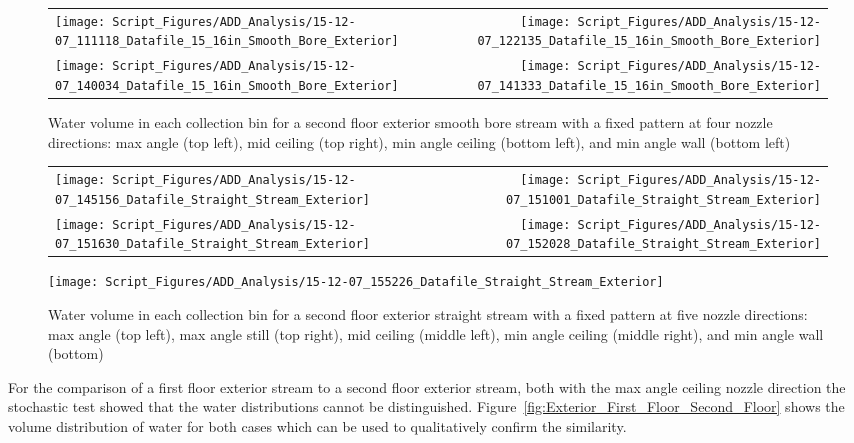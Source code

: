 \documentclass{article}
\begin{document}
\begin{figure}[ht]
\begin{tabular*}{\textwidth}{lr}
\texttt{[image: Script\_Figures/ADD\_Analysis/15-12-07\_111118\_Datafile\_15\_16in\_Smooth\_Bore\_Exterior]} &
\texttt{[image: Script\_Figures/ADD\_Analysis/15-12-07\_122135\_Datafile\_15\_16in\_Smooth\_Bore\_Exterior]} \\
\texttt{[image: Script\_Figures/ADD\_Analysis/15-12-07\_140034\_Datafile\_15\_16in\_Smooth\_Bore\_Exterior]} &
\texttt{[image: Script\_Figures/ADD\_Analysis/15-12-07\_141333\_Datafile\_15\_16in\_Smooth\_Bore\_Exterior]} \\
\end{tabular*}
\caption{Water volume in each collection bin for a second floor exterior smooth bore stream with a fixed pattern at four nozzle directions: max angle (top left), mid ceiling (top right), min angle ceiling (bottom left), and min angle wall (bottom left)}
\label{fig:Exterior_Second_Floor_Varying_Nozzle_Directions_SB_Fixed_Pattern}
\end{figure}

\begin{figure}[ht]
\begin{tabular*}{\textwidth}{lr}
\texttt{[image: Script\_Figures/ADD\_Analysis/15-12-07\_145156\_Datafile\_Straight\_Stream\_Exterior]} &
\texttt{[image: Script\_Figures/ADD\_Analysis/15-12-07\_151001\_Datafile\_Straight\_Stream\_Exterior]} \\
\texttt{[image: Script\_Figures/ADD\_Analysis/15-12-07\_151630\_Datafile\_Straight\_Stream\_Exterior]} &
\texttt{[image: Script\_Figures/ADD\_Analysis/15-12-07\_152028\_Datafile\_Straight\_Stream\_Exterior]} \\
\end{tabular*}
\centering
\texttt{[image: Script\_Figures/ADD\_Analysis/15-12-07\_155226\_Datafile\_Straight\_Stream\_Exterior]} \\
\caption{Water volume in each collection bin for a second floor exterior straight stream with a fixed pattern at five nozzle directions: max angle (top left), max angle still (top right), mid ceiling (middle left), min angle ceiling (middle right), and min angle wall (bottom)}
\label{fig:Exterior_Second_Floor_Varying_Nozzle_Directions_SS_Fixed_Pattern}
\end{figure}

\clearpage

For the comparison of a first floor exterior stream to a second floor exterior stream, both with the max angle ceiling nozzle direction the stochastic test showed that the water distributions cannot be distinguished. Figure~\ref{fig:Exterior_First_Floor_Second_Floor} shows the volume distribution of water for both cases which can be used to qualitatively confirm the similarity.
\end{document}
